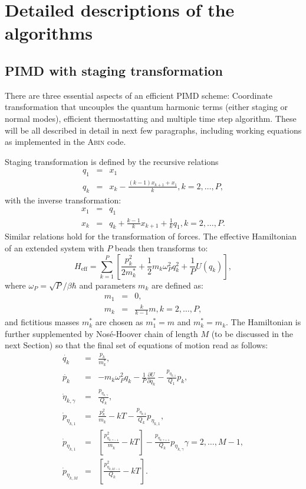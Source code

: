 \section{Detailed descriptions of the algorithms}
\subsection{PIMD with staging transformation}
There are three essential aspects of an efficient PIMD scheme: Coordinate transformation that uncouples the quantum harmonic terms (either staging or normal modes), efficient thermostatting and multiple time step algorithm. These will be all described in detail in next few paragraphs, including working equations as implemented in the \textsc{Abin} code.

Staging transformation is defined by the recursive relations 
\begin{eqnarray}
q_1&=&x_1 \nonumber \\
q_k&=&x_k - \frac{(k-1)x_{k+1}+x_1}{k},   k=2,\dots,P ,
\end{eqnarray}
with the inverse transformation:
\begin{eqnarray}
x_1&=&q_1 \nonumber \\
x_k&=&q_k+\frac{k-1}{k}x_{k+1}+\frac{1}{k}q_1,   k=2,\dots,P .
\end{eqnarray}
Similar relations hold for the transformation of forces.
The effective Hamiltonian of an extended system with $P$ beads  %
then transforms to: 
\begin{equation}
H_{\mathrm{eff}}= \sum^P_{k=1}\left[\frac{p_k^2}{2m^*_k} + \frac{1}{2}m_k\omega_P^2 q_k^2+\frac{1}{P}U(q_k)\right]  ,
\end{equation}
where $\omega_P=\sqrt{P}/\beta\hbar$ and parameters $m_k$ are defined as:
\begin{eqnarray}
m_1 &=& 0, \\
m_k &=& \frac{k}{k-1}m,   k=2,\dots ,P ,
\end{eqnarray}
and fictitious masses $m_k^*$ are chosen as $m^*_1=m$ and $m_k^*=m_k$. The Hamiltonian is further supplemented by Nosé-Hoover chain of length $M$ (to be discussed in the next Section) so that the final set of equations of motion read as follows:
\begin{subequations}
\label{eqPIMDfull}
\begin{eqnarray}
\dot{q_k}&=&\frac{p_k}{m_k^{*}}  ,\\
\dot{p_k}&=&-m_k\omega^2_P q_k - \frac{1}{P}\frac{\partial U}{\partial q_k} - \frac{p_{\eta_{k,1}}}{Q_1}p_k  , \\
\dot{\eta}_{k,\gamma}&=&\frac{p_{\eta_{k, \gamma}}}{Q_k}   ,\\
\label{eqNHC1}
\dot{p}_{\eta_{k,1}}&=&\frac{p_k^2}{m_k^{}}-kT-\frac{p_{\eta_{k,2}}}{Q_k}p_{\eta_{k,1}}   ,\\
\dot{p}_{\eta_{k,1}}&=&\left[\frac{p_{\eta_{k,\gamma-1}}^2}{m_k^{}}-kT\right]-\frac{p_{\eta_{k,\gamma+1}}}{Q_k}p_{\eta_{k,\gamma}}   \gamma = 2,\dots ,M-1   , \\
\dot{p}_{\eta_{k,M}}&=&\left[\frac{p_{\eta_{k,M-1}}^2}{Q_k}-kT\right]  .
\end{eqnarray}
\end{subequations}
